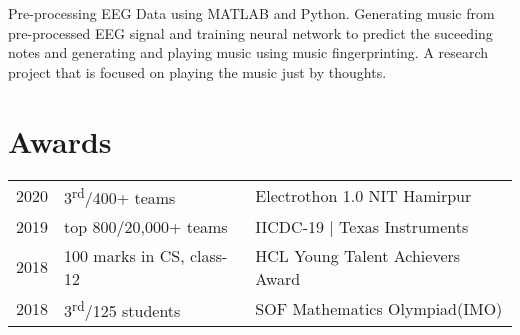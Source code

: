 \documentclass[a4paper]{deedy-resume} %
\begin{document}
\begin{minipage}[t]{0.66\textwidth}

Pre-processing EEG Data using MATLAB and Python. Generating music from pre-processed EEG signal and training neural network to predict the suceeding notes and generating and playing music using music fingerprinting. A research project that is focused on playing the music just by thoughts.
\sectionspace %


\section{Awards} 

\begin{tabular}{rll}
2020	 & 3\textsuperscript{rd}/400+ teams & Electrothon 1.0 NIT Hamirpur\\
2019	 & top 800/20,000+ teams & IICDC-19 | Texas Instruments\\
2018	 & 100 marks in CS, class-12 & HCL Young Talent Achievers Award\\
2018	 & 3\textsuperscript{rd}/125 students & SOF Mathematics Olympiad(IMO)\\
\end{tabular}

\sectionspace %


\end{minipage} %








\end{document}
